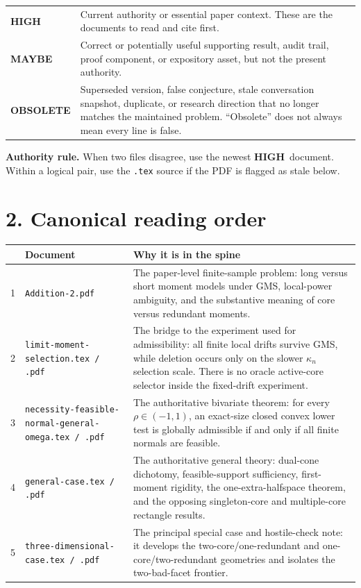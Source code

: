 \documentclass[10pt]{article}
\newcommand{\high}{\colorbox{highbg}{\textcolor{highfg}{\sffamily\bfseries HIGH}}}
\newcommand{\maybe}{\colorbox{maybebg}{\textcolor{maybefg}{\sffamily\bfseries MAYBE}}}
\newcommand{\obsolete}{\colorbox{oldbg}{\textcolor{oldfg}{\sffamily\bfseries OBSOLETE}}}
\newcommand{\fname}[1]{{\footnotesize\nolinkurl{#1}}}
\begin{document}
\begin{tabularx}{\textwidth}{@{}p{}X@{}}
\high & Current authority or essential paper context.  These are the documents to read and cite first.\\[3pt]
\maybe & Correct or potentially useful supporting result, audit trail, proof component, or expository asset, but not the present authority.\\[3pt]
\obsolete & Superseded version, false conjecture, stale conversation snapshot, duplicate, or research direction that no longer matches the maintained problem.  ``Obsolete'' does not always mean every line is false.\\
\end{tabularx}

\textbf{Authority rule.}  When two files disagree, use the newest \high\ document.  Within a logical pair, use the \texttt{.tex} source if the PDF is flagged as stale below.

\section*{2. Canonical reading order}

\begin{longtable}{@{}L{0.035\textwidth}L{0.31\textwidth}L{0.565\textwidth}@{}}
\toprule
& \textbf{Document} & \textbf{Why it is in the spine}\\
\midrule
{} & \fname{Addition-2.pdf} & The paper-level finite-sample problem: long versus short moment models under GMS, local-power ambiguity, and the substantive meaning of core versus redundant moments.\\[4pt]
2 & \fname{limit-moment-selection.tex / .pdf} & The bridge to the experiment used for admissibility: all finite local drifts survive GMS, while deletion occurs only on the slower $\kappa_n$ selection scale.  There is no oracle active-core selector inside the fixed-drift experiment.\\[4pt]
3 & \fname{necessity-feasible-normal-general-omega.tex / .pdf} & The authoritative bivariate theorem: for every $\rho\in(-1,1)$, an exact-size closed convex lower test is globally admissible if and only if all finite normals are feasible.\\[4pt]
4 & \fname{general-case.tex / .pdf} & The authoritative general theory: dual-cone dichotomy, feasible-support sufficiency, first-moment rigidity, the one-extra-halfspace theorem, and the opposing singleton-core and multiple-core rectangle results.\\[4pt]
5 & \fname{three-dimensional-case.tex / .pdf} & The principal special case and hostile-check note: it develops the two-core/one-redundant and one-core/two-redundant geometries and isolates the two-bad-facet frontier.\\
\bottomrule
\end{longtable}
\end{document}
